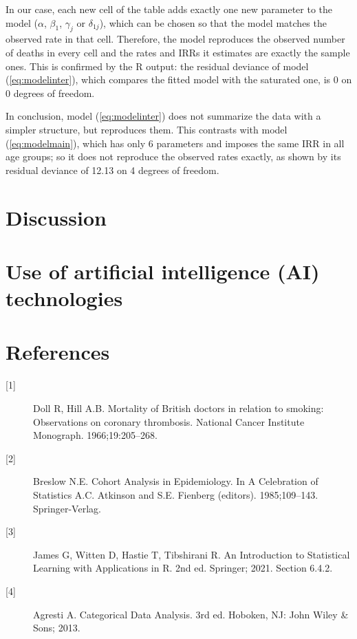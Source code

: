 \documentclass[a4paper,10pt]{article}\usepackage[]{graphicx}\usepackage[]{xcolor}
\begin{document}
\begin{enumerate}
In our case, each new cell of the table adds exactly one new parameter to the model ($\alpha$, $\beta_1$, $\gamma_j$ or $\delta_{1j}$), which can be chosen so that the model matches the observed rate in that cell. Therefore, the model reproduces the observed number of deaths in every cell and the rates and IRRs it estimates are exactly the sample ones. This is confirmed by the R output: the residual deviance of model (\ref{eq:modelinter}), which compares the fitted model with the saturated one, is 0 on 0 degrees of freedom.

In conclusion, model (\ref{eq:modelinter}) does not summarize the data with a simpler structure, but reproduces them. This contrasts with model (\ref{eq:modelmain}), which has only 6 parameters and imposes the same IRR in all age groups; so it does not reproduce the observed rates exactly, as shown by its residual deviance of 12.13 on 4 degrees of freedom.


\end{enumerate}


\section{Discussion}
\label{sec:section4}

\section{Use of artificial intelligence (AI) technologies}

\section*{References}
\label{sec:references}

\begin{description}
    \item[{\hypertarget{ref:doll}{[1]}}]
    Doll R, Hill A.B. Mortality of British doctors in relation to smoking:
    Observations on coronary thrombosis. National Cancer Institute
    Monograph. 1966;19:205--268.

    \item[{\hypertarget{ref:breslow}{[2]}}]
    Breslow N.E. Cohort Analysis in Epidemiology. In A Celebration of
    Statistics A.C. Atkinson and S.E. Fienberg (editors).
    1985;109--143. Springer-Verlag.
    
    \item[{\hypertarget{ref:james}{[3]}}]
    James G, Witten D, Hastie T, Tibshirani R. An Introduction to Statistical
    Learning with Applications in R. 2nd ed. Springer; 2021. Section 6.4.2.

    \item[{\hypertarget{ref:agresti}{[4]}}]
    Agresti A. Categorical Data Analysis. 3rd ed. Hoboken, NJ: John Wiley \&
    Sons; 2013.
\end{description}
\end{document}
